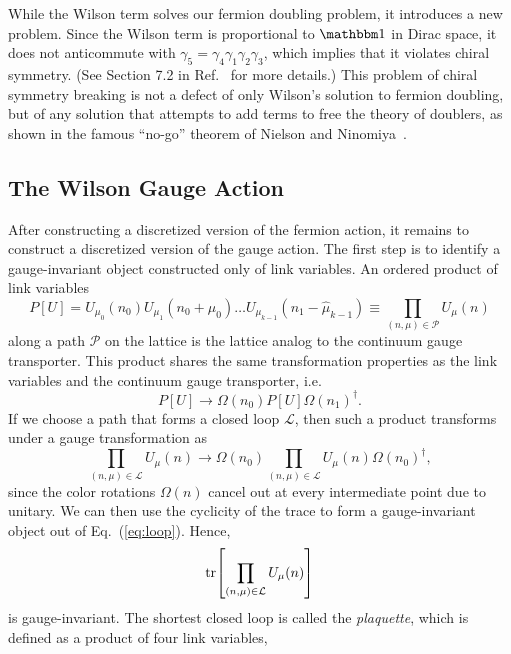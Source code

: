 While the Wilson term solves our fermion doubling problem, it introduces a new problem. Since the Wilson term is proportional to $\mathbbm 1$ in Dirac space, it does not anticommute with $\gamma_5 = \gamma_4 \gamma_1 \gamma_2 \gamma_3$, which implies that it violates chiral symmetry. (See Section 7.2 in Ref.~\cite{Gattringer:2010zz} for more details.) This problem of chiral symmetry breaking is not a defect of only Wilson's solution to fermion doubling, but of any solution that attempts to add terms to free the theory of doublers, as shown in the famous ``no-go'' theorem of Nielson and Ninomiya~\cite{Nielsen:1981hk}.
\subsection{The Wilson Gauge Action}
After constructing a discretized version of the fermion action, it remains to construct a discretized version of the gauge action. The first step is to identify a gauge-invariant object constructed only of link variables. An ordered product of link variables
\begin{equation}
    P[U]=U_{\mu_{0}}\left(n_{0}\right) U_{\mu_{1}}\left(n_{0}+\hat{\mu}_{0}\right) \ldots U_{\mu_{k-1}}\left(n_{1}-\hat{\mu}_{k-1}\right) \equiv \prod_{(n, \mu) \in \mathcal{P}} U_{\mu}(n)
\end{equation}
along a path $\mathcal P$ on the lattice is the lattice analog to the continuum gauge transporter. This product shares the same transformation properties as the link variables and the continuum gauge transporter, i.e.\
\begin{equation}
    P[U] \rightarrow \Omega\left(n_{0}\right) P[U] \Omega\left(n_{1}\right)^{\dagger}.
\end{equation}
If we choose a path that forms a closed loop $\mathcal L$, then such a product transforms under a gauge transformation as
\begin{equation}\label{eq:loop}
    \prod_{(n, \mu) \in \mathcal{L}} U_{\mu}(n) \rightarrow \Omega\left(n_{0}\right) \prod_{(n, \mu) \in \mathcal{L}} U_{\mu}(n) \Omega\left(n_{0}\right)^{\dagger},
\end{equation}
since the color rotations $\Omega(n)$ cancel out at every intermediate point due to unitary. We can then use the cyclicity of the trace to form a gauge-invariant object out of Eq.~(\ref{eq:loop}). Hence,
\begin{equation}
    \tr[\prod_{(n, \mu) \in \mathcal{L}} U_{\mu}(n)]
\end{equation}
is gauge-invariant. The shortest closed loop is called the \emph{plaquette}, which is defined as a product of four link variables,
